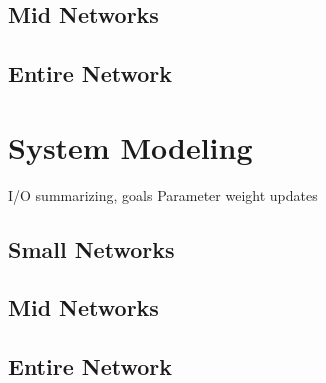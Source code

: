 \subsection{Mid Networks}

\subsection{Entire Network}

\section{System Modeling}

I/O summarizing, goals
Parameter weight updates

\subsection{Small Networks}

\subsection{Mid Networks}

\subsection{Entire Network}